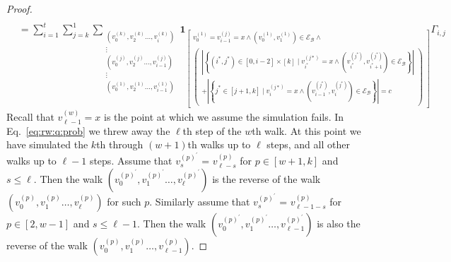 \documentclass{report}
\begin{document}
\begin{proof}
\begin{align}
\\
\label{eq:rw:q:prob}
&= 
\sum_{i = 1}^{t} 
\sum_{j =k}^{1} 
\sum_{\substack{
	\left (v_0^{(k)}, v_2^{(k)} \dots, v_i^{(k)} \right ) \\
	\vdots \\
	\left (v_0^{(j)}, v_2^{(j)} \dots, v_{i-1}^{(j)} \right ) \\
	\vdots \\
	\left (v_0^{(1)}, v_2^{(1)} \dots, v_{i-1}^{(1)} \right ) \\
}}
\mathbf{1}_{ \left [\substack{
	v_0^{(1)} = v_{i-1}^{(j)} = x 
			\wedge \left ( v_0^{(1)}, v_1^{(1)} \right ) \in \mathcal{E}_\mathcal{B} 
			\wedge \\
	\left ( \substack{
		\left | \left \{ 
				(i^*,j^*) \in [0, i-2] \times [k] 
						\mid v_{i^*}^{(j*)} = x 
						\wedge \left ( v_{i^*}^{(j^*)}, v_{i^*+1}^{(j^*)} \right ) \in \mathcal{E}_\mathcal{B}
		\right \} \right | \\
		+ \left | \left \{ 
				j^* \in [j + 1, k] 
						\mid v_{i}^{(j*)} = x 
						\wedge \left ( v_{i - 1}^{(j^*)}, v_{i}^{(j^*)} \right ) \in \mathcal{E}_\mathcal{B}
		\right \} \right | = c
	} \right )
}\right ]}
\Gamma_{i,j}
\end{align}
%
Recall that $v_{\ell-1}^{(w)} = x$ is the point at which we assume the simulation fails.
In Eq.~\eqref{eq:rw:q:prob} we threw away the $\ell$th step of the $w$th walk. 
At this point we have simulated the $k$th through $(w+1)$th walks up to $\ell$ steps, and all other walks up to $\ell-1$ steps.
Assume that $v^{(p)^\prime}_s$ = $v^{(p)}_{\ell - s}$ for $p \in [w+1, k]$ and $s \leq \ell$.
Then the walk $\left ( v_0^{(p)^\prime}, v_1^{(p)^\prime} \dots, v_\ell^{(p)^\prime} \right )$ is the reverse of the walk $\left ( v_0^{(p)}, v_1^{(p)} \dots, v_\ell^{(p)} \right )$ for such $p$.
Similarly assume that $v^{(p)^\prime}_s$ = $v^{(p)}_{\ell -1 - s}$ for $p \in [2, w-1]$ and $s \leq \ell-1$.
Then the walk $	\left ( v_0^{(p)^\prime}, v_1^{(p)^\prime} \dots, v_{\ell-1}^{(p)^\prime} \right )$ is also the reverse of the walk $\left ( v_0^{(p)}, v_{1}^{(p)} \dots, v_{\ell-1}^{(p)} \right )$.

\end{proof}
\end{document}
